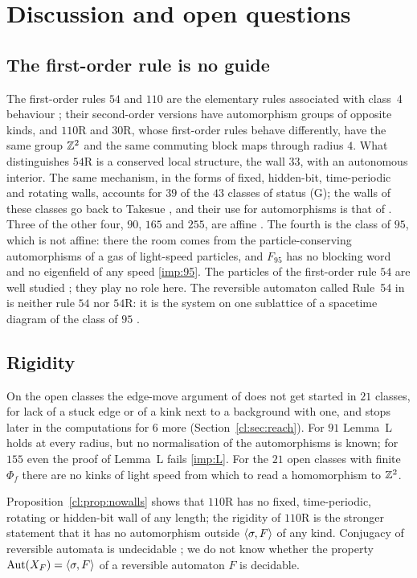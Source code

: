 \section{Discussion and open questions}\label{sec:discussion}

\subsection{The first-order rule is no guide}
The first-order rules $54$ and $110$ are the elementary rules associated with class~4 behaviour \cite[pp.~693--697]{Wolfram2002}; their second-order versions have automorphism groups of opposite kinds, and $110$R and $30$R, whose first-order rules behave differently, have the same group $\mathbb{Z}^2$ and the same commuting block maps through radius $4$. What distinguishes $54$R is a conserved local structure, the wall $33$, with an autonomous interior. The same mechanism, in the forms of fixed, hidden-bit, time-periodic and rotating walls, accounts for $39$ of the $43$ classes of status (G); the walls of these classes go back to Takesue \cite[Section~4]{Takesue1989}, and their use for automorphisms is that of \cite{PaperC}. Three of the other four, $90$, $165$ and $255$, are affine \cite{PaperC}. The fourth is the class of $95$, which is not affine: there the room comes from the particle-conserving automorphisms of a gas of light-speed particles, and $F_{95}$ has no blocking word and no eigenfield of any speed \eqref{imp:95}. The particles of the first-order rule $54$ are well studied \cite{BNR1991,MACC2012}; they play no role here. The reversible automaton called Rule~54 in \cite{BBGP1993,BKP2021} is neither rule $54$ nor $54$R: it is the system on one sublattice of a spacetime diagram of the class of $95$ \cite{PaperE}.

\subsection{Rigidity}
On the open classes the edge-move argument of \cite{PaperA} does not get started in $21$ classes, for lack of a stuck edge or of a kink next to a background with one, and stops later in the computations for $6$ more (Section~\ref{cl:sec:reach}). For $91$ Lemma~L holds at every radius, but no normalisation of the automorphisms is known; for $155$ even the proof of Lemma~L fails \eqref{imp:L}. For the $21$ open classes with finite $\Phi_f$ there are no kinks of light speed from which to read a homomorphism to $\mathbb{Z}^2$.

Proposition~\ref{cl:prop:nowalls} shows that $110$R has no fixed, time-periodic, rotating or hidden-bit wall of any length; the rigidity of $110$R \cite{PaperA} is the stronger statement that it has no automorphism outside $\langle\sigma,F\rangle$ of any kind. Conjugacy of reversible automata is undecidable \cite{Salo2020}; we do not know whether the property $\operatorname{Aut}(X_F)=\langle\sigma,F\rangle$ of a reversible automaton $F$ is decidable.

